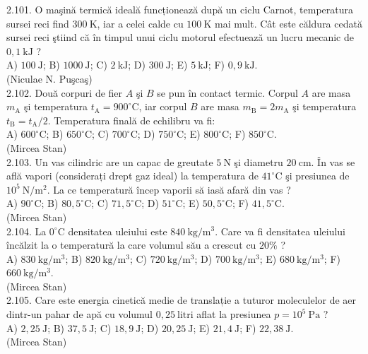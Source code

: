 2.101. O maşină termică ideală funcționează după un ciclu Carnot, temperatura sursei reci find $300 \mathrm{~K}$, iar a celei calde cu $100 \mathrm{~K}$ mai mult. Cât este căldura cedată sursei reci ştiind că în timpul unui ciclu motorul efectuează un lucru mecanic de $0,1 \mathrm{~kJ}$ ?\\ A) $100 \mathrm{~J}$; B) $1000 \mathrm{~J}$; C) $2 \mathrm{~kJ}$; D) $300 \mathrm{~J}$; E) $5 \mathrm{~kJ}$; F) $0,9 \mathrm{~kJ}$.\\ (Niculae N. Puşcaş)\\

2.102. Două corpuri de fier $A$ şi $B$ se pun în contact termic. Corpul $A$ are masa $m_{\mathrm{A}}$ şi temperatura $t_{\mathrm{A}}=900^{\circ} \mathrm{C}$, iar corpul $B$ are masa $m_{\mathrm{B}}=2 m_{\mathrm{A}}$ şi temperatura $t_{\mathrm{B}}=t_{\mathrm{A}} / 2$. Temperatura finală de echilibru va fi:\\ A) $600^{\circ} \mathrm{C}$; B) $650^{\circ} \mathrm{C}$; C) $700^{\circ} \mathrm{C}$; D) $750^{\circ} \mathrm{C}$; E) $800^{\circ} \mathrm{C}$; F) $850^{\circ} \mathrm{C}$.\\ (Mircea Stan)\\

2.103. Un vas cilindric are un capac de greutate $5 \mathrm{~N}$ şi diametru $20 \mathrm{~cm}$. În vas se află vapori (considerați drept gaz ideal) la temperatura de $41^{\circ} \mathrm{C}$ şi presiunea de $10^{5} \mathrm{~N} / \mathrm{m}^{2}$. La ce temperatură încep vaporii să iasă afară din vas ?\\ A) $90^{\circ} \mathrm{C}$; B) $80,5^{\circ} \mathrm{C}$; C) $71,5^{\circ} \mathrm{C}$; D) $51^{\circ} \mathrm{C}$; E) $50,5^{\circ} \mathrm{C}$; F) $41,5^{\circ} \mathrm{C}$.\\ (Mircea Stan)\\

2.104. La $0^{\circ} \mathrm{C}$ densitatea uleiului este $840 \mathrm{~kg} / \mathrm{m}^{3}$. Care va fi densitatea uleiului încălzit la o temperatură la care volumul său a crescut cu $20 \%$ ?\\ A) $830 \mathrm{~kg} / \mathrm{m}^{3}$; B) $820 \mathrm{~kg} / \mathrm{m}^{3}$; C) $720 \mathrm{~kg} / \mathrm{m}^{3}$; D) $700 \mathrm{~kg} / \mathrm{m}^{3}$; E) $680 \mathrm{~kg} / \mathrm{m}^{3}$; F) $660 \mathrm{~kg} / \mathrm{m}^{3}$.\\ (Mircea Stan)\\

2.105. Care este energia cinetică medie de translație a tuturor moleculelor de aer dintr-un pahar de apă cu volumul $0,25 \mathrm{~litri}$ aflat la presiunea $p=10^{5} \mathrm{~Pa}$ ?\\ A) $2,25 \mathrm{~J}$; B) $37,5 \mathrm{~J}$; C) $18,9 \mathrm{~J}$; D) $20,25 \mathrm{~J}$; E) $21,4 \mathrm{~J}$; F) $22,38 \mathrm{~J}$.\\ (Mircea Stan)\\

